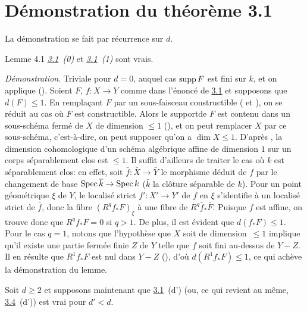 \documentclass[10pt]{../fichiers-configuration-latex/smfart}
\begin{document}
\section{Démonstration du théorème 3.1}

La démonstration se fait par récurrence sur $d$.

\begin{enonce*}{Lemme 4.1}
\emph{\hyperref[XIV.thm3.1]{3.1}~(0)} et \emph{\hyperref[XIV.thm3.1]{3.1}~(1)} sont vrais.
\end{enonce*}

\noindent
\emph{Démonstration}. Triviale pour $d=0$, auquel cas $\operatorname{supp} F$ est
fini sur $k$, et on applique (). Soient $F$, $f:X\rightarrow
Y$ comme dans l'énoncé de \hyperref[XIV.thm3.1]{3.1} et supposons que $d(F)\leq 1$. En
remplaçant $F$ par un sous-faisceau constructible ( et ), 
on se réduit au cas où $F$ est constructible. Alors le
support\pageoriginale de $F$ est contenu dans un sous-schéma fermé de
$X$ de dimension $\leq 1$ (), et on peut remplacer $X$ par
ce sous-schéma, c'est-à-dire, on peut supposer qu'on a $\dim X\leq
1$. D'après , la dimension cohomologique d'un schéma algébrique
affine de dimension $1$ sur un corps séparablement clos est $\leq 1$. Il
suffit d'ailleurs de traiter le cas où $k$ est séparablement clos: en
effet, soit $\bar{f}:\bar{X}\rightarrow \bar{Y}$ le morphisme déduit
de $f$ par le changement de base $\operatorname{Spec} \overline{k}\rightarrow \operatorname{Spec} k$
($\bar{k}$ la clôture séparable de $k$). Pour un point géométrique
$\xi$ de $Y$, le localisé strict $f':X'\rightarrow Y'$ de $f$ en $\xi$
s'identifie à un localisé strict de $\bar{f}$, donc la fibre
$(R^{q}f_{\ast}F)_{\xi}$ à une fibre de
$R^{q}\bar{f}_{\ast}\bar{F}$. Puisque $f$ est affine, on trouve donc
que $R^{q}f_{\ast}F=0$ si $q>1$. De plus, il est évident que
$d(f_{\ast}F)\leq 1$. Pour le cas $q=1$, notons que
l'hypothèse que $X$ soit de dimension~$\leq 1$ implique qu'il existe
une partie fermée finie $Z$ de $Y$ telle que $f$ soit fini au-dessus
de $Y-Z$. Il en résulte que $R^{1}f_{\ast}F$ est nul dans $Y-Z$ (), 
d'où $d(R^{1}f_{\ast}F)\leq 1$, ce qui achève la démonstration
du lemme.

Soit $d\geq 2$ et supposons maintenant que \hyperref[XIV.thm3.1]{3.1}~(d') (ou, ce
qui revient au même, \hyperref[XIV.cor3.4]{3.4}~(d')) est vrai pour $d'<d$.
\end{document}

